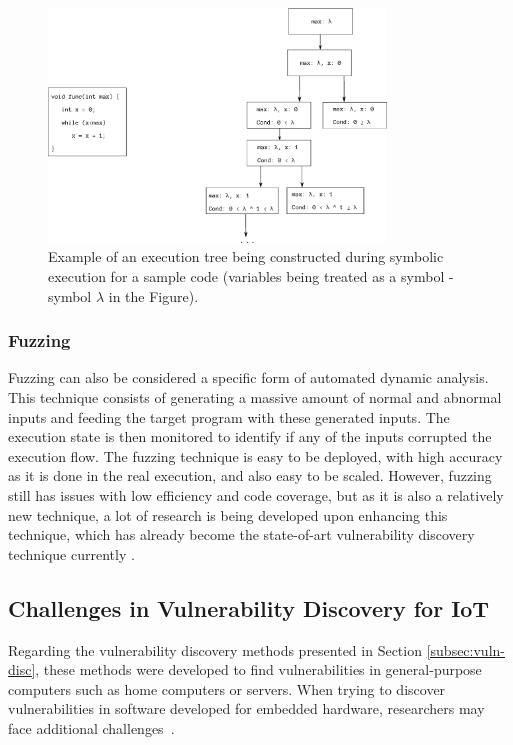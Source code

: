 \begin{figure}[H]
    \centering
    \includegraphics[width=0.8\textwidth]{figs/symbolicalle.eps}
    \caption{Example of an execution tree being constructed during symbolic execution for a sample code (variables being treated as a symbol  - symbol $\lambda$ in the Figure).}
    \label{fig:symbolic-execution}
\end{figure}


\subsubsection{Fuzzing}

Fuzzing can also be considered a specific form of automated dynamic analysis. This technique consists of generating a massive amount of normal and abnormal inputs and feeding the target program with these generated inputs. The execution state is then monitored to identify if any of the inputs corrupted the execution flow. The fuzzing technique is easy to be deployed, with high accuracy as it is done in the real execution, and also easy to be scaled. However, fuzzing still has issues with low efficiency and code coverage, but as it is also a relatively new technique, a lot of research is being developed upon enhancing this technique, which has already become the state-of-art vulnerability discovery technique currently \cite{fuzzing}.


\subsection{Challenges in Vulnerability Discovery for IoT}

Regarding the vulnerability discovery methods presented in Section \ref{subsec:vuln-disc}, these methods were developed to find vulnerabilities in general-purpose computers such as home computers or servers. When trying to discover vulnerabilities in software developed for embedded hardware, researchers may face additional challenges~\cite{real-or-rehosted}.

